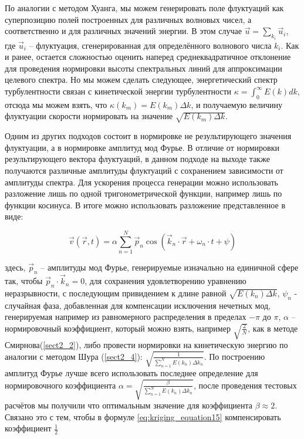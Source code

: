 По аналогии с методом Хуанга, мы можем генерировать поле флуктуаций как суперпозицию полей построенных для различных волновых чисел, а соответственно и для различных значений энергии. В этом случае $\vec u = \sum_{k_{i}} \vec u_i$, где $\vec u_i$ -- флуктуация, сгенерированная для определённого волнового числа $k_i$. Как и ранее, остается сложностью оценить наперед среднеквадратичное отклонение для проведения нормировки высоты спектральных линий для аппроксимации целевого спектра. Но мы можем сделать следующее, энергетический спектр турбулентности связан с кинетической энергии турбулентности $\kappa = \int_{0}^{\infty} E(k) dk$, отсюда мы можем взять, что $\kappa(k_m) = E(k_m) \Delta k$, и получаемую величину флуктуации скорости нормировать на значение $\sqrt{E(k_m) \Delta k}$. 

Одним из других подходов состоит в нормировке не результирующего значения флуктуации, а в нормировке амплитуд мод Фурье. В отличие от нормировки результирующего вектора флуктуаций, в данном подходе на выходе также получаются различные амплитуды флуктуаций с сохранением зависимости от амплитуды спектра. Для ускорения процесса генерации можно использовать разложение лишь по одной тригонометрической функции, например лишь по функции косинуса. В итоге можно использовать разложение представленное в виде:

\begin{equation}
    \label{eq:part3_3}
    \vec v(\vec r, t) = \alpha \sum_{n = 1}^{N} \vec p_n \cos( \vec k_n \cdot \vec r + \omega_n \cdot t + \psi)  
\end{equation}

\noindent 
здесь, $\vec p_n$ -- амплитуды мод Фурье, генерируемые изначально на единичной сфере так, чтобы $\vec p_n \cdot \vec k_n = 0$, для сохранения удовлетворению уравнению неразрывности, с последующим привидением к длине равной $\sqrt{E(k_n)\Delta k}$, $\psi_n$ - случайная фаза, добавленная для компенсации исключения нечетных мод, генерируемая например из равномерного распределения в пределах $-\pi$ до $\pi$, $\alpha$ -- нормировочный коэффициент, который можно взять, например $\sqrt{\frac{2}{N}}$, как в методе Смирнова(\ref{sect2_2}), либо провести нормировки на кинетическую энергию по аналогии с методом Шура (\ref{sect2_4}): $\sqrt{\frac{1}{\sum_{n=1}^{N} E(k_n) \Delta k_n}}$. По построению амплитуд Фурье лучше всего использовать последнее определение для нормировочного коэффициента $\alpha = \sqrt{\frac{\beta}{\sum_{n=1}^{N} E(k_n) \Delta k_n}}$, после проведения тестовых расчётов мы получили что оптимальным значение для коэффициента $\beta \approx 2$. Связано это с тем, чтобы в формуле \eqref{eq:kriging_equation15} компенсировать коэффициент $\frac{1}{2}$

